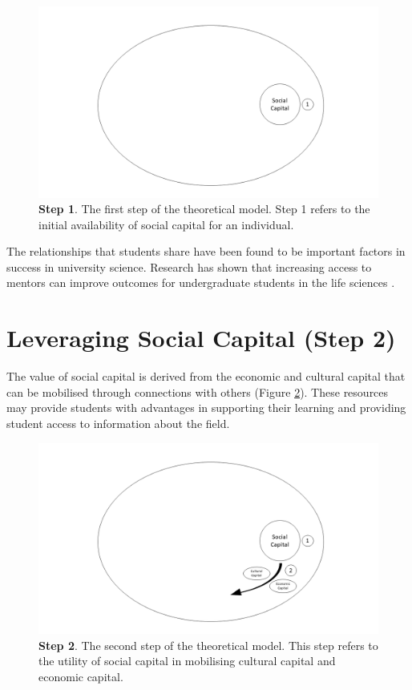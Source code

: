 \begin{figure}[h!]
\centering
\includegraphics[width=\textwidth]{C5 - Understanding Capital Accumulation/HabitusSocCap_TheoreticalModel1.png}
\caption{\label{fig:TheoreticalModel1_C5}\textbf{Step 1}. The first step of the theoretical model. Step 1 refers to the initial availability of social capital for an individual.}
\end{figure}

The relationships that students share have been found to be important factors in success in university science. Research has shown that increasing access to mentors can improve outcomes for undergraduate students in the life sciences \citep{aikens2016social}. 


\section{Leveraging Social Capital (Step 2)}
The value of social capital is derived from the economic and cultural capital that can be mobilised through connections with others (Figure \ref{fig:TheoreticalModel2_C5}). These resources may provide students with advantages in supporting their learning and providing student access to information about the field. 

\begin{figure}[ht]
\centering
\includegraphics[width=\textwidth]{C5 - Understanding Capital Accumulation/HabitusSocCap_TheoreticalModel2.png}
\caption{\label{fig:TheoreticalModel2_C5}\textbf{Step 2}. The second step of the theoretical model. This step refers to the utility of social capital in mobilising cultural capital and economic capital.}
\end{figure}

